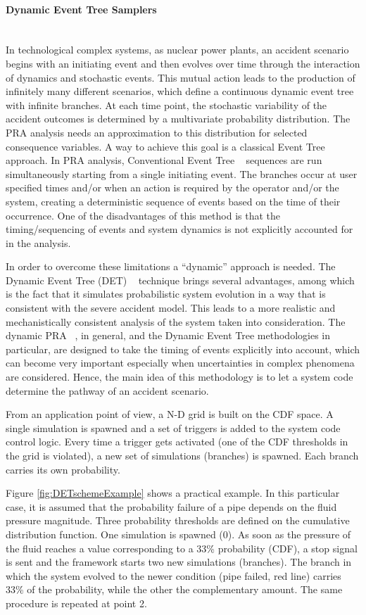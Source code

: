 \paragraph{Dynamic Event Tree Samplers}~\\
In technological complex systems, as nuclear power plants, an accident scenario begins with an initiating event and then evolves over time through the interaction of dynamics and stochastic events. This mutual action leads to the production of infinitely many different scenarios, which define a continuous dynamic event tree with infinite branches. At each time point, the stochastic variability of the accident outcomes is determined by a multivariate probability distribution. The PRA analysis needs an approximation to this distribution for selected consequence variables. A way to achieve this goal is a classical Event Tree approach. In PRA analysis, Conventional Event Tree ~\cite{} sequences are run simultaneously starting from a single initiating event. The branches occur at user specified times and/or when an action is required by the operator and/or the system, creating a deterministic sequence of events based on the time of their occurrence. One of the disadvantages of this method is that the timing/sequencing of events and system dynamics is not explicitly accounted for in the analysis. 

In order to overcome these limitations a “dynamic” approach is needed. The Dynamic Event Tree (DET) ~\cite{} technique brings several advantages, among which is the fact that it simulates probabilistic system evolution in a way that is consistent with the severe accident model. This leads to a more realistic and mechanistically consistent analysis of the system taken into consideration. The dynamic PRA ~\cite{}, in general, and the Dynamic Event Tree methodologies in particular, are designed to take the timing of events explicitly into account, which can become very important especially when uncertainties in complex phenomena are considered. Hence, the main idea of this methodology is to let a system code determine the pathway of an accident scenario.

From an application point of view, a N-D grid is built on the CDF space. A single simulation is spawned and a set of triggers is added to the system code control logic. Every time a trigger gets activated (one of the CDF thresholds in the grid is violated), a new set of simulations (branches) is spawned. Each branch carries its own probability. 

Figure \ref{fig:DETschemeExample} shows a practical example. In this particular case, it is assumed that the 
probability failure of a pipe depends on the fluid pressure magnitude. Three probability thresholds are defined on 
the cumulative distribution function. One simulation is spawned (0). As soon as the pressure of the fluid reaches a 
value corresponding to a 33\% probability (CDF), a stop signal is sent and the framework starts two new 
simulations (branches). The branch in which the system evolved to the newer condition (pipe failed, red line) 
carries 33\% of the probability, while the other the complementary amount. The same procedure is repeated at 
point 2.

